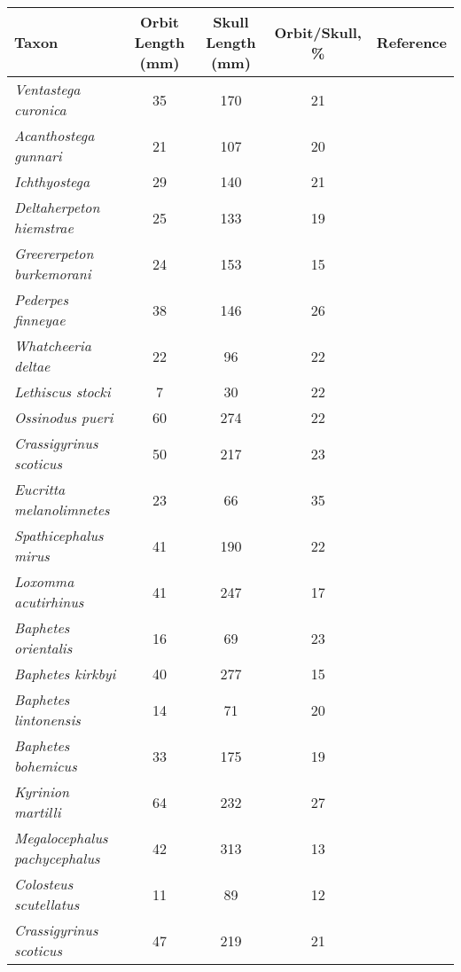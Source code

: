 \begin{tabular}{|L{4.5cm}|c|c|c|L{4.5cm}|}
\hline
\textbf{Taxon}&\textbf{Orbit Length (mm)}&\textbf{Skull Length (mm)}&\textbf{Orbit/Skull, \%}&\textbf{Reference}\\\hline
\textit{Ventastega curonica}&35&170&21&\citet{Ahlb08a}\\\hline
\textit{Acanthostega gunnari}&21&107&20&\citet{Clac02b,Porr15a}\\\hline
\textit{Ichthyostega}&29&140&21&\citet{Bent90a}\\\hline
\textit{Deltaherpeton hiemstrae}&25&133&19&\citet{Bolt10a}\\\hline
\textit{Greererpeton burkemorani}&24&153&15&\citet{Bent90a}\\\hline
\textit{Pederpes finneyae}&38&146&26&\citet{Clac02a}\\\hline
\textit{Whatcheeria deltae}&22&96&22&\citet{Lomb95a}\\\hline
\textit{Lethiscus stocki}&7&30&22&\citet{Well82a}\\\hline
\textit{Ossinodus pueri}&60&274&22&\citet{Warr04a,Warr07a}\\\hline
\textit{Crassigyrinus scoticus}&50&217&23&\citet{Panc85a}\\\hline
\textit{Eucritta melanolimnetes}&23&66&35&\citet{Clac98a}\\\hline
\textit{Spathicephalus mirus}&41&190&22&\citet{Beau98a}\\\hline
\textit{Loxomma acutirhinus}&41&247&17&\citet{Beau77a}\\\hline
\textit{Baphetes orientalis}&16&69&23&\citet{Miln09a}\\\hline
\textit{Baphetes kirkbyi}&40&277&15&\citet{Beau77a}\\\hline
\textit{Baphetes lintonensis}&14&71&20&\citet{Beau77a}\\\hline
\textit{Baphetes bohemicus}&33&175&19&\citet{Beau77a}\\\hline
\textit{Kyrinion martilli}&64&232&27&\citet{Clac03a}\\\hline
\textit{Megalocephalus pachycephalus}&42&313&13&\citet{Beau77a}\\\hline
\textit{Colosteus scutellatus}&11&89&12&\citet{Hook83a}\\\hline
\textit{Crassigyrinus scoticus}&47&219&21&\citet{Bent90a}\\\hline
\end{tabular}
